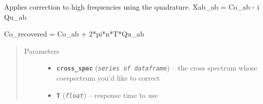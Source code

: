 \documentclass[a4paper,10pt,oneside]{sphinxmanual}
\begin{document}
\begin{fulllineitems}
\label{pymicra.micro:pymicra.micro.spectral.hfc_Dias_ea_16}
Applies correction to high frequencies using the quadrature.
Xab\_ab = Co\_ab - i Qu\_ab

Co\_recovered = Co\_ab + 2*pi*n*T*Qu\_ab
\begin{quote}\begin{description}
\item[{Parameters}] \leavevmode\begin{itemize}
\item {} 
\textbf{\texttt{cross\_spec}} (\emph{\texttt{series of dataframe}}) -- the cross spectrum whose coespectrum you'd like to correct

\item {} 
\textbf{\texttt{T}} (\emph{\texttt{float}}) -- response time to use

\end{itemize}

\end{description}\end{quote}

\end{fulllineitems}


\begin{fulllineitems}
\label{pymicra.micro:pymicra.micro.spectral.hfc_Massman_Ibrom_08}
\end{fulllineitems}

\end{document}
